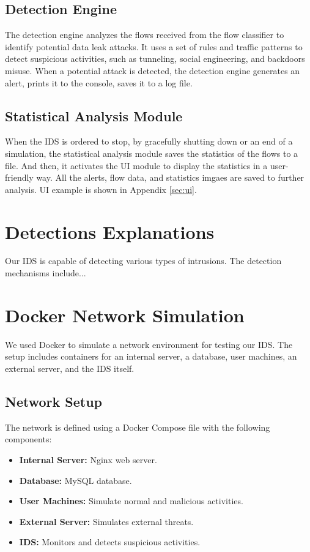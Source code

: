 \documentclass{article}
\begin{document}
\subsection{Detection Engine}
The detection engine analyzes the flows received from the flow classifier to identify potential data leak attacks.
It uses a set of rules and traffic patterns to detect suspicious activities, such as tunneling, social engineering, and backdoors misuse.
When a potential attack is detected, the detection engine generates an alert, prints it to the console, saves it to a log file.

\subsection{Statistical Analysis Module}
When the IDS is ordered to stop, by gracefully shutting down or an end of a simulation, the statistical analysis module saves the statistics of the flows to a file.
And then, it activates the UI module to display the statistics in a user-friendly way.
All the alerts, flow data, and statistics imgaes are saved to further analysis.
UI example is shown in Appendix \ref{sec:ui}.

\section{Detections Explanations}
Our IDS is capable of detecting various types of intrusions. The detection mechanisms include...


\section{Docker Network Simulation}
We used Docker to simulate a network environment for testing our IDS. The setup includes containers for an internal server, a database, user machines, an external server, and the IDS itself.

\subsection{Network Setup}
The network is defined using a Docker Compose file with the following components:
\begin{itemize}
    \item \textbf{Internal Server:} Nginx web server.
    \item \textbf{Database:} MySQL database.
    \item \textbf{User Machines:} Simulate normal and malicious activities.
    \item \textbf{External Server:} Simulates external threats.
    \item \textbf{IDS:} Monitors and detects suspicious activities.
\end{itemize}
\end{document}
